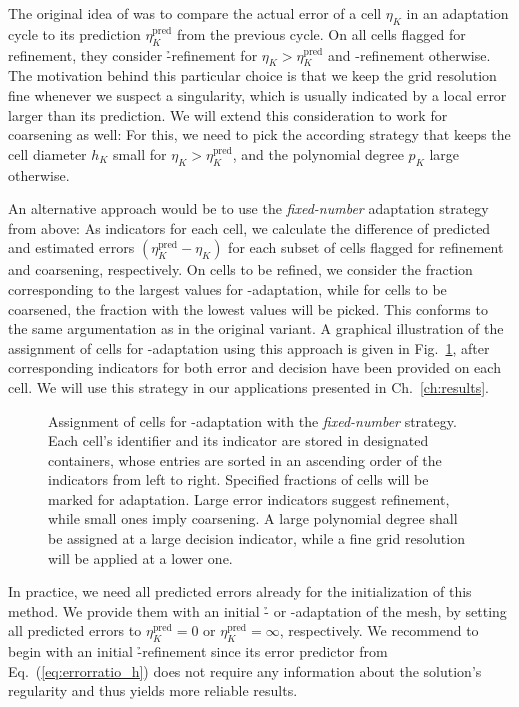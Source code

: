 The original idea of \textcite{melenk2001} was to compare the actual error of a cell $\eta_K$ in an adaptation cycle to its prediction $\eta_K^\text{pred}$ from the previous cycle. On all cells flagged for refinement, they consider \h-refinement for $\eta_K > \eta_K^\text{pred}$ and \p-refinement otherwise. The motivation behind this particular choice is that we keep the grid resolution fine whenever we suspect a singularity, which is usually indicated by a local error larger than its prediction. We will extend this consideration to work for coarsening as well: For this, we need to pick the according strategy that keeps the cell diameter $h_K$ small for $\eta_K > \eta_K^\text{pred}$, and the polynomial degree $p_K$ large otherwise.

An alternative approach would be to use the \textit{fixed-number} adaptation strategy from above: As indicators for each cell, we calculate the difference of predicted and estimated errors $(\eta_K^\text{pred} - \eta_K)$ for each subset of cells flagged for refinement and coarsening, respectively. On cells to be refined, we consider the fraction corresponding to the largest values for \p-adaptation, while for cells to be coarsened, the fraction with the lowest values will be picked. This conforms to the same argumentation as in the original variant. A graphical illustration of the assignment of cells for \hp-adaptation using this approach is given in Fig.~\ref{fig:indicators}, after corresponding indicators for both error and decision have been provided on each cell. We will use this strategy in our applications presented in Ch.~\ref{ch:results}.

\begin{figure}
\centering

\caption[Assignment of cells for \hp-adaptation with the \textit{fixed-number} strategy.]{Assignment of cells for \hp-adaptation with the \textit{fixed-number} strategy. Each cell's identifier and its indicator are stored in designated containers, whose entries are sorted in an ascending order of the indicators from left to right. Specified fractions of cells will be marked for adaptation. Large error indicators suggest refinement, while small ones imply coarsening. A large polynomial degree shall be assigned at a large decision indicator, while a fine grid resolution will be applied at a lower one.}
\label{fig:indicators}
\end{figure}

In practice, we need all predicted errors already for the initialization of this method. We provide them with an initial \h- or \p-adaptation of the mesh, by setting all predicted errors to $\eta_K^\text{pred} = 0$ or $\eta_K^\text{pred} = \infty$, respectively. We recommend to begin with an initial \h-refinement since its error predictor from Eq.~(\ref{eq:errorratio_h}) does not require any information about the solution's regularity and thus yields more reliable results.

